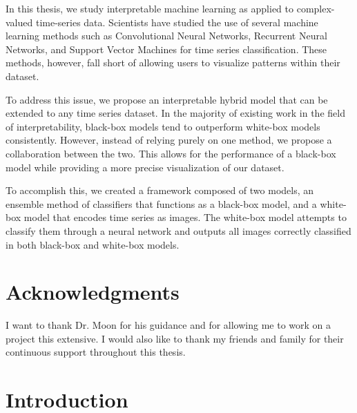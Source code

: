 \documentclass{turabian-thesis}
\begin{document}

In this thesis, we study interpretable machine learning as applied to complex-valued time-series data. Scientists have studied the use of several machine learning methods such as Convolutional Neural Networks, Recurrent Neural Networks, and Support Vector Machines for time series classification. These methods, however, fall short of allowing users to visualize patterns within their dataset.

To address this issue, we propose an interpretable hybrid model that can be extended to any time series dataset. In the majority of existing work in the field of interpretability, black-box models tend to outperform white-box models consistently. However, instead of relying purely on one method, we propose a collaboration between the two. This allows for the performance of a black-box model while providing a more precise visualization of our dataset.

To accomplish this, we created a framework composed of two models, an ensemble method of classifiers that functions as a black-box model, and a white-box model that encodes time series as images. The white-box model attempts to classify them through a neural network and outputs all images correctly classified in both black-box and white-box models.

\chapter{Acknowledgments}

I want to thank Dr. Moon for his guidance and for allowing me to work on a project this extensive. I would also like to thank my friends and family for their continuous support throughout this thesis.

\tableofcontents
\listofillustrations

\mainmatter
\chapter{Introduction}
\label{chap:introduction}
\end{document}
